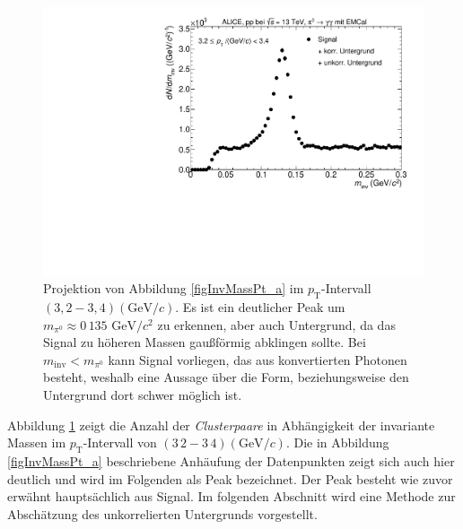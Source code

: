 \begin{figure}[tbp]
\centering
\includegraphics[width=.75\linewidth]{hSignalPlusBkg.pdf}
\caption{Projektion von Abbildung \ref{figInvMassPt_a} im $p_{\text{T}}$-Intervall $(3,2 - 3,4) (\text{GeV/}c)$. Es ist ein deutlicher Peak um $m_{\pi^{0}} \approx 0\,135\text{ GeV/}c^{2}$ zu erkennen, aber auch Untergrund, da das Signal zu höheren Massen gaußförmig abklingen sollte. Bei $m_{\text{inv}} < m_{\pi^{0}}$ kann Signal vorliegen, das aus konvertierten Photonen besteht, weshalb eine Aussage über die Form, beziehungsweise den Untergrund dort schwer möglich ist.}
\label{figSignalPlusBkg}
\end{figure}
\newline
Abbildung \ref{figSignalPlusBkg} zeigt die Anzahl der \textit{Clusterpaare} in Abhängigkeit der invariante Massen im $p_{\text{T}}$-Intervall von $(3\,2 - 3\,4)(\text{GeV}/c)$.
Die in Abbildung \ref{figInvMassPt_a} beschriebene Anhäufung der Datenpunkten zeigt sich auch hier deutlich und wird im Folgenden als Peak bezeichnet.
Der Peak besteht wie zuvor erwähnt hauptsächlich aus Signal.
\newline
Im folgenden Abschnitt wird eine Methode zur Abschätzung des unkorrelierten Untergrunds vorgestellt. 
